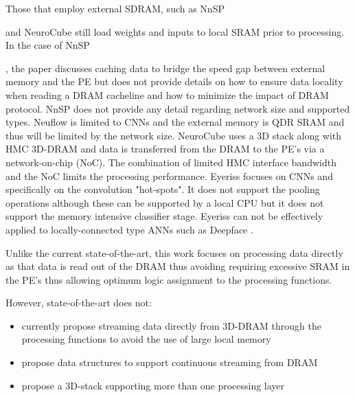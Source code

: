 Those that employ external SDRAM, such as NnSP{\cite{esmaeilzadeh2005nnsp} and NeuroCube\cite{kim2016neurocube} still 
load weights and inputs to local SRAM prior to processing.
In the case of NnSP{\cite{esmaeilzadeh2005nnsp}, the paper discusses caching data to bridge the speed gap between external memory and the PE 
but does not provide details on how to ensure data locality when reading a DRAM cacheline and how to minimize the impact of DRAM protocol.
NnSP does not provide any detail regarding network size and supported types.
Neuflow\cite{farabet2011neuflow} is limited to CNNs and the external memory is QDR SRAM 
and thus will be limited by the network size.
NeuroCube uses a 3D stack along with HMC 3D-DRAM and data is transferred from the DRAM to the PE's via a network-on-chip (NoC).
The combination of limited HMC interface bandwidth and the NoC limits the processing performance.
Eyeriss\cite{chen201614} focuses on CNNs and specifically on the convolution "hot-spots". It does not support the pooling operations although these can
be supported by a local CPU but it does not support the memory intensive classifier stage. 
Eyeriss can not be effectively applied to locally-connected type ANNs such as Deepface \cite{Taigman_2014_CVPR}.

\iffalse
Unlike the current state-of-the-art, this work focuses on processing data directly as that data is read out of the DRAM thus avoiding requiring excessive SRAM
in the PE's thus allowing optimum logic assignment to the processing functions.

However, state-of-the-art does not:
\vspace{-3mm}
\begin{itemize}
  \itemsep-1.5mm
  \item currently propose streaming data directly from 3D-DRAM through the processing functions to avoid the use of large local memory
  \item propose data structures to support continuous streaming from DRAM
  \item propose a 3D-stack supporting more than one processing layer
\end{itemize}

}}
